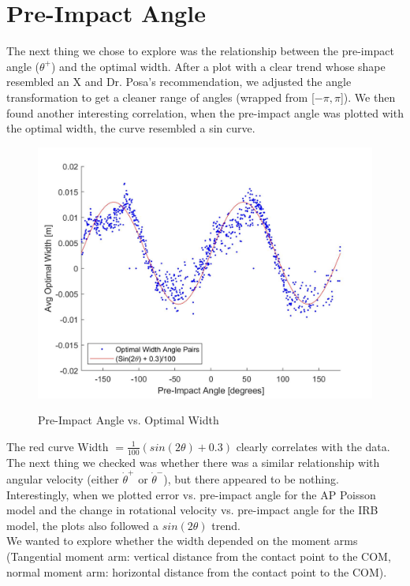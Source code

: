 \documentclass{article}
\begin{document}
\newpage
\section{Pre-Impact Angle}
The next thing we chose to explore was the relationship between the pre-impact angle ($\theta^+$) and the optimal width. After a plot with a clear trend whose shape resembled an X and Dr. Posa's recommendation, we adjusted the angle transformation to get a cleaner range of angles (wrapped from [$-\pi, \pi$]). We then found another interesting correlation, when the pre-impact angle was plotted with the optimal width, the curve resembled a sin curve. 

\begin{figure}[h!]
\centering
\caption{Pre-Impact Angle vs. Optimal Width}
\includegraphics[scale=0.2]{preImpactAngle}
\label{fig:preAngle}
\end{figure}

\noindent The red curve Width $= \frac{1}{100}(sin(2\theta)+0.3)$ clearly correlates with the data. The next thing we checked was whether there was a similar relationship with angular velocity (either $\dot\theta^+$ or $\dot\theta^-$), but there appeared to be nothing. \\

\noindent Interestingly, when we plotted error vs. pre-impact angle for the AP Poisson model and the change in rotational velocity vs. pre-impact angle for the IRB model, the plots also followed a $sin(2\theta)$ trend. \\

\noindent We wanted to explore whether the width depended on the moment arms (Tangential moment arm: vertical distance from the contact point to the COM, normal moment arm: horizontal distance from the contact point to the COM). \\
\end{document}
